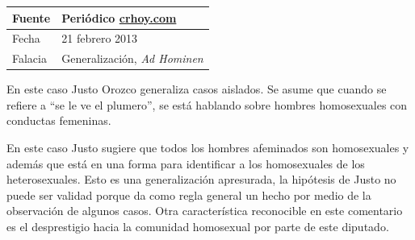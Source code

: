 \documentclass[times]{simauth}
\begin{document}
\newpage
\begin{table}[h!]
    \begin{tabular}{ll} 
        \toprule[1.5pt]
        Fuente & Periódico \href{http://crhoy.com}{crhoy.com}\\
        \midrule[0.5pt]
        Fecha  & 21 febrero 2013\\
        \midrule[0.5pt]
        Falacia & Generalización, \textit{Ad Hominen}\\
        \bottomrule[1.5pt]
    \end{tabular} 
\end{table}

En este caso Justo Orozco generaliza casos aislados. Se asume que cuando se refiere a ``se le ve el plumero'', se está hablando sobre hombres homosexuales con conductas femeninas. 

En este caso Justo sugiere que todos los hombres afeminados son homosexuales y además que está en una forma para identificar a los homosexuales de los heterosexuales. 
Esto es una generalización apresurada, la hipótesis de Justo no puede ser validad porque da como regla general un hecho por medio de la observación de algunos casos. Otra característica reconocible en este comentario es el desprestigio hacia la comunidad homosexual por parte de este diputado.



%
%
%
\end{document}
